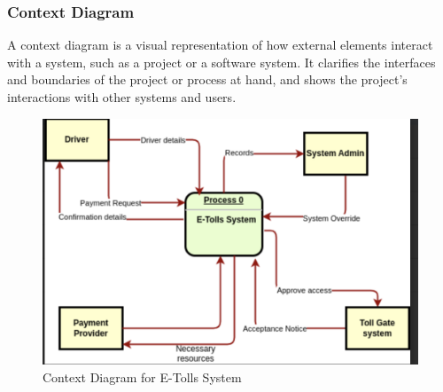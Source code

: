 \subsubsection{Context Diagram}
A context diagram is a visual representation of how external elements interact with a system, such as a project or a software system. It clarifies the interfaces and boundaries of the project or process at hand, and shows the project’s interactions with other systems and users\cite{wysocki2006effective}.

\begin{figure}[h]
    \begin{center}
        \includegraphics[scale = 0.6]{images/context_diagram}
        \caption{Context Diagram for E-Tolls System}
    \end{center}
\end{figure}